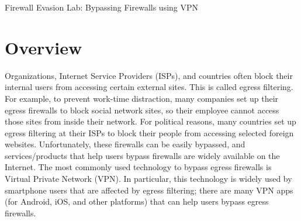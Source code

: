 
\newcommand{\commonfolder}{../../common-files}




\newcommand{\firewallFigs}{./Figs}





\begin{center}
{\LARGE Firewall Evasion Lab: Bypassing Firewalls using VPN}
\end{center}



\setcounter{task}{1}
\newcommand{\tasks} {\bf {\noindent (\arabic{task})} \addtocounter{task}{1} \,}


\section{Overview}


Organizations, Internet Service Providers (ISPs), and countries often block
their internal users from accessing certain external sites. This is called
egress filtering. 
For example, to prevent work-time distraction, many companies set up their egress firewalls
to block social network sites, so their employee cannot access those sites
from inside their network. For political reasons, many countries set up egress filtering at their
ISPs to block their people from accessing
selected foreign websites. Unfortunately, these firewalls can be easily
bypassed, and services/products that help users bypass firewalls are widely
available on the Internet. The most commonly used technology to bypass
egress firewalls is Virtual Private Network (VPN).
In particular, this technology is widely used by smartphone users that are affected by
egress filtering; there are many VPN apps (for Android, iOS, and other
platforms) that can help users bypass egress firewalls. 


